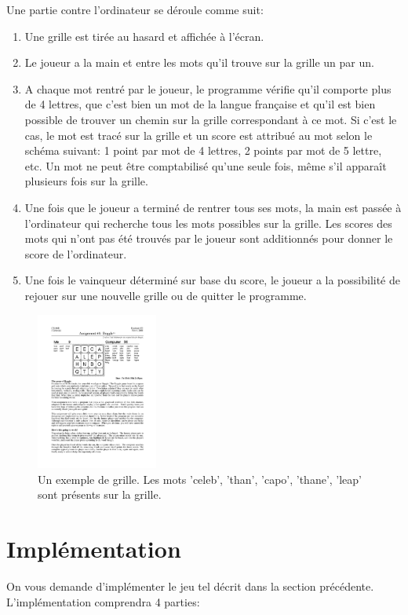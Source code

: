 \documentclass[a4paper,10pt]{article}
\begin{document}
Une partie contre l'ordinateur se déroule comme suit:
\begin{enumerate}
\item Une grille est tirée au hasard et affichée à l'écran.
\item Le joueur a la main et entre les mots qu'il trouve sur la
  grille un par un.
\item A chaque mot rentré par le joueur, le programme vérifie
  qu'il comporte plus de 4 lettres, que c'est bien un mot de la langue
  française et qu'il est bien possible de trouver un chemin sur la
  grille correspondant à ce mot. Si c'est le cas, le mot est tracé sur
  la grille et un score est attribué au mot selon le schéma suivant: 1
  point par mot de 4 lettres, 2 points par mot de 5 lettre, etc. Un
  mot ne peut être comptabilisé qu'une seule fois, même s'il
  apparaît plusieurs fois sur la grille.
\item Une fois que le joueur a terminé de rentrer tous ses mots, la
  main est passée à l'ordinateur qui recherche tous les mots possibles
  sur la grille. Les scores des mots qui n'ont pas été
  trouvés par le joueur sont additionnés pour donner le score de
  l'ordinateur.
\item Une fois le vainqueur déterminé sur base du score, le joueur
  a la possibilité de rejouer sur une nouvelle grille ou de quitter le
  programme.
\end{enumerate}

\begin{figure}[h]
\centerline{\includegraphics[width=4cm]{grille.pdf}}
\caption{Un exemple de grille. Les mots 'celeb', 'than', 'capo',
  'thane', 'leap' sont présents sur la grille.\label{fig:grille}}
\end{figure}

\section{Implémentation}

On vous demande d'implémenter le jeu tel décrit dans la section précédente.
L'implémentation comprendra 4 parties:
\end{document}
